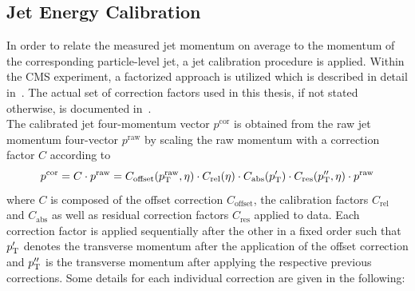 \subsection{Jet Energy Calibration}
\label{subsec:jets_calib}
In order to relate the measured jet momentum on average to the momentum of the corresponding particle-level jet, a jet calibration procedure is applied. Within the CMS experiment, a factorized approach is utilized which is described in detail in~\cite{1748-0221-6-11-P11002}. The actual set of correction factors used in this thesis, if not stated otherwise, is documented in~\cite{CMS-DP-2013-033}. \\
The calibrated jet four-momentum vector $p^\mathrm{cor}$ is obtained from the raw jet momentum four-vector $p^\mathrm{raw}$ by scaling the raw momentum with a correction factor $C$ according to
\begin{equation}
p^\mathrm{cor} = C \cdot p^\mathrm{raw} = C_{\mathrm{offset}}(p_{\text{T}}^\mathrm{raw}, \eta) \cdot C_{\mathrm{rel}}(\eta) \cdot C_{\mathrm{abs}}(p_{\text{T}}') \cdot C_\mathrm{res}(p_{\text{T}}'', \eta) \cdot p^\mathrm{raw}
\end{equation} 
 where $C$ is composed of the offset correction $C_{\mathrm{offset}}$, the calibration factors $C_{\mathrm{rel}}$ and $C_{\mathrm{abs}}$ as well as residual correction factors $C_{\mathrm{res}}$ applied to data. Each correction factor is applied sequentially after the other in a fixed order such that $p_{\text{T}}'$ denotes the transverse momentum after the application of the offset correction and $p_{\text{T}}''$ is the transverse momentum after applying the respective previous corrections. Some details for each individual correction are given in the following: 
